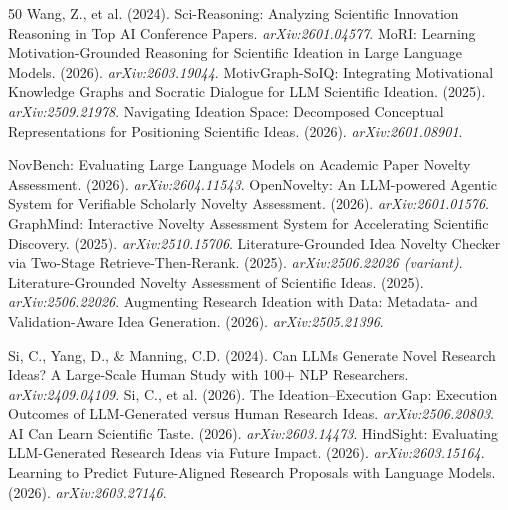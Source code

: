 \documentclass[10pt,a4paper]{article}
\begin{document}
\begin{thebibliography}{50}
 Wang, Z., et al. (2024). Sci-Reasoning: Analyzing Scientific Innovation Reasoning in Top AI Conference Papers. \textit{arXiv:2601.04577}.
 MoRI: Learning Motivation-Grounded Reasoning for Scientific Ideation in Large Language Models. (2026). \textit{arXiv:2603.19044}.
 MotivGraph-SoIQ: Integrating Motivational Knowledge Graphs and Socratic Dialogue for LLM Scientific Ideation. (2025). \textit{arXiv:2509.21978}.
 Navigating Ideation Space: Decomposed Conceptual Representations for Positioning Scientific Ideas. (2026). \textit{arXiv:2601.08901}.

 NovBench: Evaluating Large Language Models on Academic Paper Novelty Assessment. (2026). \textit{arXiv:2604.11543}.
 OpenNovelty: An LLM-powered Agentic System for Verifiable Scholarly Novelty Assessment. (2026). \textit{arXiv:2601.01576}.
 GraphMind: Interactive Novelty Assessment System for Accelerating Scientific Discovery. (2025). \textit{arXiv:2510.15706}.
 Literature-Grounded Idea Novelty Checker via Two-Stage Retrieve-Then-Rerank. (2025). \textit{arXiv:2506.22026 (variant)}.
 Literature-Grounded Novelty Assessment of Scientific Ideas. (2025). \textit{arXiv:2506.22026}.
 Augmenting Research Ideation with Data: Metadata- and Validation-Aware Idea Generation. (2026). \textit{arXiv:2505.21396}.

 Si, C., Yang, D., \& Manning, C.D. (2024). Can LLMs Generate Novel Research Ideas? A Large-Scale Human Study with 100+ NLP Researchers. \textit{arXiv:2409.04109}.
 Si, C., et al. (2026). The Ideation--Execution Gap: Execution Outcomes of LLM-Generated versus Human Research Ideas. \textit{arXiv:2506.20803}.
 AI Can Learn Scientific Taste. (2026). \textit{arXiv:2603.14473}.
 HindSight: Evaluating LLM-Generated Research Ideas via Future Impact. (2026). \textit{arXiv:2603.15164}.
 Learning to Predict Future-Aligned Research Proposals with Language Models. (2026). \textit{arXiv:2603.27146}.


\end{thebibliography}
\end{document}
